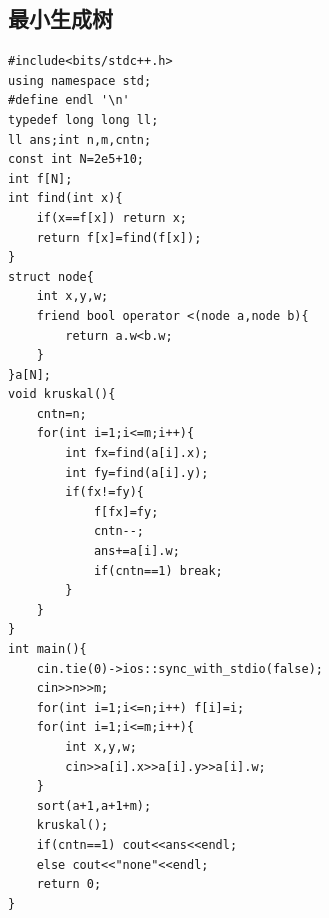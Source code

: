 \documentclass[11pt,a4paper,twocolumn]{ctexart}  %
\begin{document}
\subsection{最小生成树}
\begin{lstlisting}[caption={Kruskal求最小生成树},label={Kruskal}]
#include<bits/stdc++.h>
using namespace std;
#define endl '\n'
typedef long long ll;
ll ans;int n,m,cntn;
const int N=2e5+10;
int f[N];
int find(int x){
    if(x==f[x]) return x;
    return f[x]=find(f[x]);
}
struct node{
    int x,y,w;
    friend bool operator <(node a,node b){
        return a.w<b.w;
    }
}a[N];
void kruskal(){
    cntn=n;
    for(int i=1;i<=m;i++){
        int fx=find(a[i].x);
        int fy=find(a[i].y);
        if(fx!=fy){
            f[fx]=fy;
            cntn--;
            ans+=a[i].w;
            if(cntn==1) break;
        }
    }
}
int main(){
    cin.tie(0)->ios::sync_with_stdio(false);
    cin>>n>>m;
    for(int i=1;i<=n;i++) f[i]=i;
    for(int i=1;i<=m;i++){
        int x,y,w;
        cin>>a[i].x>>a[i].y>>a[i].w;
    }
    sort(a+1,a+1+m);
    kruskal();
    if(cntn==1) cout<<ans<<endl;
    else cout<<"none"<<endl;
    return 0;
}
\end{lstlisting}
\end{document}
